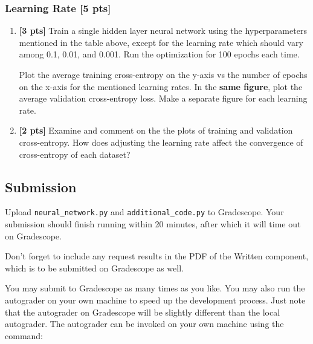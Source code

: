 \subsubsection{Learning Rate [5 pts]}
\begin{enumerate}
    \item \textbf{[3 pts]} Train a single hidden layer neural network using the hyperparameters mentioned in the table above, except for the learning rate which should vary among 0.1, 0.01, and 0.001. Run the optimization for 100 epochs each time.

    Plot the average training cross-entropy on the y-axis vs the number of epochs on the x-axis for the mentioned learning rates. In the \textbf{same figure}, plot the average validation cross-entropy loss. Make a separate figure for each learning rate.
    
    \begin{tcolorbox}[fit,height=10cm, width=\textwidth, blank, borderline={1pt}{-2pt},nobeforeafter]

    \end{tcolorbox}
    
    \item \textbf{[2 pts]} Examine and comment on the the plots of training and validation cross-entropy. How does adjusting the learning rate affect the convergence of cross-entropy of each dataset?
    
    \begin{tcolorbox}[fit,height=2cm, width=\textwidth, blank, borderline={1pt}{-2pt},nobeforeafter]

    \end{tcolorbox}
\end{enumerate}

\subsection{Submission}

Upload \texttt{neural\_network.py} and \texttt{additional\_code.py} to Gradescope. Your submission should finish running within 20 minutes, after which it will time out on Gradescope.

Don't forget to include any request results in the PDF of the Written component, which is to be submitted on Gradescope as well.

You may submit to Gradescope as many times as you like. You may also run the autograder on your own machine to speed up the development process. Just note that the autograder on Gradescope will be slightly different than the local autograder. The autograder can be invoked on your own machine using the command:

